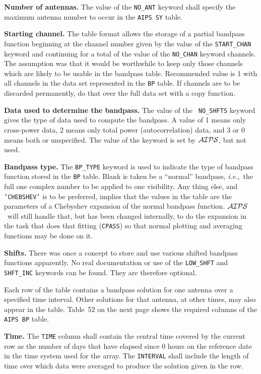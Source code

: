 \documentclass[twoside]{article}
\newcommand{\AIPS}{{$\cal AIPS\/$}}
\newcommand{\ie}{{\it i.e.},}
\begin{document}
{\bf Number of antennas.} The value of the {\tt NO\_ANT} keyword shall
specify the maximum antenna number to occur in the {\tt AIPS SY} table.

{\bf Starting channel.} The table format allows the storage of a
partial bandpass function beginning at the channel number given by the
value of the {\tt START\_CHAN} keyword and continuing for a total of
the value of the {\tt NO\_CHAN} keyword channels.  The assumption was
that it would be worthwhile to keep only those channels which are
likely to be usable in the bandpass table.  Recommended value is 1
with all channels in the data set represented in the {\tt BP} table.
If channels are to be discarded permanently, do that over the full
data set with a copy function.

{\bf Data used to determine the bandpass.} The value of the {\tt
  NO\_SHFTS} keyword gives the type of data used to compute the
bandpass.  A value of 1 means only cross-power data, 2  means only
total power (autocorrelation) data, and 3 or 0 means both or
unspecified.  The value of the keyword is set by \AIPS, but not used.

{\bf Bandpass type.} The {\tt BP\_TYPE} keyword is used to indicate
the type of bandpass function stored in the {\tt BP} table.  Blank is
taken be a ``normal'' bandpass, \ie\ the full one complex number to be
applied to one visibility.  Any thing else, and {\tt 'CHEBSHEV'} is to
be preferred, implies that the values in the table are the parameters
of a Chebyshev expansion of the normal bandpass function.  \AIPS\ will
still handle that, but has been changed internally, to do the
expansion in the task that does that fitting ({\tt CPASS}) so that
normal plotting and averaging functions may be done on it.

{\bf Shifts.} There was once a concept to store and use various
shifted bandpass functions apparently.  No real documentation or use
of the {\tt LOW\_SHFT} and {\tt SHFT\_INC} keywords can be found.
They are therefore optional.

Each row of the table contains a bandpass solution for one antenna
over a specified time interval.  Other solutions for that antenna, at
other times, may also appear in the table.  Table~52 on the next page
shows the required columns of the {\tt AIPS BP} table.

{\bf Time.}  The {\tt TIME} column shall contain the central time
covered by the current row as the number of days that have elapsed
since 0 hours on the reference date in the time system used for the
array.  The {\tt INTERVAL} shall include the length of time over which
data were averaged to produce the solution given in the row.
\end{document}
